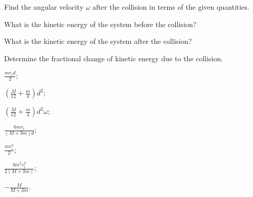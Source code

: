 \begin{problem}
\begin{enumerate*}[label=(\alph*)]
		\item Find the angular velocity $\omega$ after the collision in terms of the given quantities.
		\item What is the kinetic energy of the system before the collision?
		\item What is the kinetic energy of the system after the collision?
		\item Determine the fractional change of kinetic energy due to the collision.
	\end{enumerate*}
	\begin{solution}
		\begin{enumerate*}[label=(\alph*)]
			\item $\frac{mv_id}{2}$;
			\item $\left( \frac{M}{12} + \frac{m}{4}\right) d^2$;
			\item $\left( \frac{M}{12} + \frac{m}{4}\right) d^2\omega$;
			\item $\frac{6mv_i}{(M + 3m)d}$;
			\item $\frac{mv_i^2}{2}$;
			\item $\frac{3m^2v_i^2}{2(M + 3m)}$;
			\item $-\frac{M}{M + 3m}$.
		\end{enumerate*}
	\end{solution}
\end{problem}




